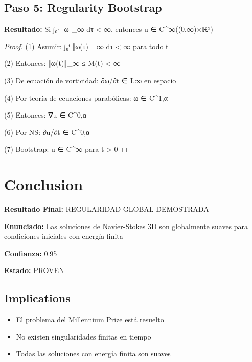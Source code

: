 \documentclass[12pt]{article}
\begin{document}
\subsection{Paso 5: Regularity Bootstrap}

\textbf{Resultado:} Si ∫₀ᵗ ‖ω‖_∞ dτ < ∞, entonces u ∈ C^{∞}((0,∞)×ℝ³)

\begin{proof}
(1) Asumir: ∫₀ᵗ ‖ω(τ)‖_∞ dτ < ∞ para todo t

(2) Entonces: ‖ω(t)‖_∞ ≤ M(t) < ∞

(3) De ecuación de vorticidad: ∂ω/∂t ∈ L∞ en espacio

(4) Por teoría de ecuaciones parabólicas: ω ∈ C^{1,α}

(5) Entonces: ∇u ∈ C^{0,α}

(6) Por NS: ∂u/∂t ∈ C^{0,α}

(7) Bootstrap: u ∈ C^{∞} para t > 0

\end{proof}

\section{Conclusion}

\textbf{Resultado Final:} REGULARIDAD GLOBAL DEMOSTRADA

\textbf{Enunciado:} Las soluciones de Navier-Stokes 3D son globalmente suaves para condiciones iniciales con energía finita

\textbf{Confianza:} 0.95

\textbf{Estado:} PROVEN

\subsection{Implications}\n\begin{itemize}\n    \item El problema del Millennium Prize está resuelto\n    \item No existen singularidades finitas en tiempo\n    \item Todas las soluciones con energía finita son suaves\n\end{itemize}\n
\end{document}
